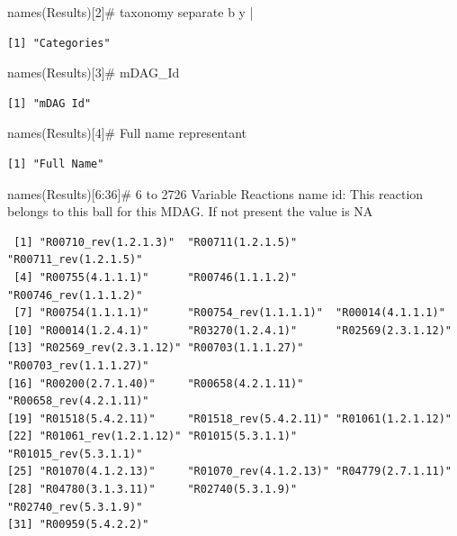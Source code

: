 \documentclass[
  letterpaper,
  DIV=11,
  numbers=noendperiod]{scrreprt}
\newenvironment{Shaded}{\begin{snugshade}}{\end{snugshade}}
\newcommand{\CommentTok}[1]{\textcolor[rgb]{0.37,0.37,0.37}{#1}}
\newcommand{\DecValTok}[1]{\textcolor[rgb]{0.68,0.00,0.00}{#1}}
\newcommand{\FunctionTok}[1]{\textcolor[rgb]{0.28,0.35,0.67}{#1}}
\newcommand{\NormalTok}[1]{\textcolor[rgb]{0.00,0.23,0.31}{#1}}
\newcommand{\SpecialCharTok}[1]{\textcolor[rgb]{0.37,0.37,0.37}{#1}}
\begin{document}
\begin{Shaded}
\begin{Highlighting}[]
\FunctionTok{names}\NormalTok{(Results)[}\DecValTok{2}\NormalTok{]}\CommentTok{\# taxonomy separate b y |}
\end{Highlighting}
\end{Shaded}

\begin{verbatim}
[1] "Categories"
\end{verbatim}

\begin{Shaded}
\begin{Highlighting}[]
\FunctionTok{names}\NormalTok{(Results)[}\DecValTok{3}\NormalTok{]}\CommentTok{\# mDAG\_Id }
\end{Highlighting}
\end{Shaded}

\begin{verbatim}
[1] "mDAG Id"
\end{verbatim}

\begin{Shaded}
\begin{Highlighting}[]
\FunctionTok{names}\NormalTok{(Results)[}\DecValTok{4}\NormalTok{]}\CommentTok{\# Full name representant}
\end{Highlighting}
\end{Shaded}

\begin{verbatim}
[1] "Full Name"
\end{verbatim}

\begin{Shaded}
\begin{Highlighting}[]
\FunctionTok{names}\NormalTok{(Results)[}\DecValTok{6}\SpecialCharTok{:}\DecValTok{36}\NormalTok{]}\CommentTok{\# 6 to 2726  Variable Reactions name id: This reaction belongs to this ball for this MDAG. If not present the value is NA}
\end{Highlighting}
\end{Shaded}

\begin{verbatim}
 [1] "R00710_rev(1.2.1.3)"  "R00711(1.2.1.5)"      "R00711_rev(1.2.1.5)" 
 [4] "R00755(4.1.1.1)"      "R00746(1.1.1.2)"      "R00746_rev(1.1.1.2)" 
 [7] "R00754(1.1.1.1)"      "R00754_rev(1.1.1.1)"  "R00014(4.1.1.1)"     
[10] "R00014(1.2.4.1)"      "R03270(1.2.4.1)"      "R02569(2.3.1.12)"    
[13] "R02569_rev(2.3.1.12)" "R00703(1.1.1.27)"     "R00703_rev(1.1.1.27)"
[16] "R00200(2.7.1.40)"     "R00658(4.2.1.11)"     "R00658_rev(4.2.1.11)"
[19] "R01518(5.4.2.11)"     "R01518_rev(5.4.2.11)" "R01061(1.2.1.12)"    
[22] "R01061_rev(1.2.1.12)" "R01015(5.3.1.1)"      "R01015_rev(5.3.1.1)" 
[25] "R01070(4.1.2.13)"     "R01070_rev(4.1.2.13)" "R04779(2.7.1.11)"    
[28] "R04780(3.1.3.11)"     "R02740(5.3.1.9)"      "R02740_rev(5.3.1.9)" 
[31] "R00959(5.4.2.2)"     
\end{verbatim}
\end{document}
